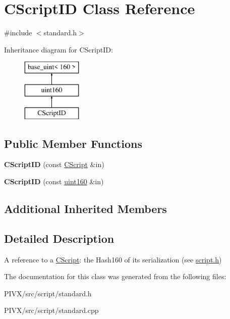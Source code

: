 \hypertarget{class_c_script_i_d}{}\section{C\+Script\+ID Class Reference}
\label{class_c_script_i_d}


{\ttfamily \#include $<$standard.\+h$>$}

Inheritance diagram for C\+Script\+ID\+:\begin{figure}[H]
\begin{center}
\leavevmode
\includegraphics[height=3.000000cm]{class_c_script_i_d}
\end{center}
\end{figure}
\subsection*{Public Member Functions}
\begin{DoxyCompactItemize}
\item 
\mbox{\label{class_c_script_i_d_ae1bc1fb715b094e03c21a237f7045902}} 
{\bfseries C\+Script\+ID} (const \mbox{\hyperlink{class_c_script}{C\+Script}} \&in)
\item 
\mbox{\label{class_c_script_i_d_a69619562a6a5fdf4ccfd20fee9418cc5}} 
{\bfseries C\+Script\+ID} (const \mbox{\hyperlink{classuint160}{uint160}} \&in)
\end{DoxyCompactItemize}
\subsection*{Additional Inherited Members}


\subsection{Detailed Description}
A reference to a \mbox{\hyperlink{class_c_script}{C\+Script}}\+: the Hash160 of its serialization (see \mbox{\hyperlink{script_8h_source}{script.\+h}}) 

The documentation for this class was generated from the following files\+:\begin{DoxyCompactItemize}
\item 
P\+I\+V\+X/src/script/standard.\+h\item 
P\+I\+V\+X/src/script/standard.\+cpp\end{DoxyCompactItemize}
